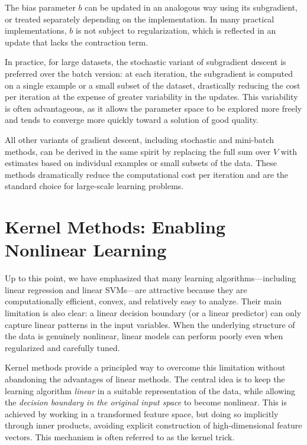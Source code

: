 The bias parameter $b$ can be updated in an analogous way using its subgradient, or treated
separately depending on the implementation. In many practical implementations, $b$ is not
subject to regularization, which is reflected in an update that lacks the contraction term.

In practice, for large datasets, the stochastic variant of subgradient descent is preferred
over the batch version: at each iteration, the subgradient is computed on a single example
or a small subset of the dataset, drastically reducing the cost per iteration at the expense
of greater variability in the updates. This variability is often advantageous, as it allows
the parameter space to be explored more freely and tends to converge more quickly toward a
solution of good quality.

\medskip

All other variants of gradient descent, including stochastic and mini-batch methods, can be derived in the same spirit by replacing the full sum over $V$ with estimates based on individual examples or small subsets of the data. These methods dramatically reduce the computational cost per iteration and are the standard choice for large-scale learning problems.


\section*{Kernel Methods: Enabling Nonlinear Learning}

Up to this point, we have emphasized that many learning algorithms---including linear regression and linear SVMs---are attractive because they are computationally efficient, convex, and relatively easy to analyze. Their main limitation is also clear: a linear decision boundary (or a linear predictor) can only capture linear patterns in the input variables. When the underlying structure of the data is genuinely nonlinear, linear models can perform poorly even when regularized and carefully tuned.

Kernel methods provide a principled way to overcome this limitation without abandoning the advantages of linear methods. The central idea is to keep the learning algorithm \emph{linear} in a suitable representation of the data, while allowing the \emph{decision boundary in the original input space} to become nonlinear. This is achieved by working in a transformed feature space, but doing so implicitly through inner products, avoiding explicit construction of high-dimensional feature vectors. This mechanism is often referred to as the \alert{kernel trick}.

